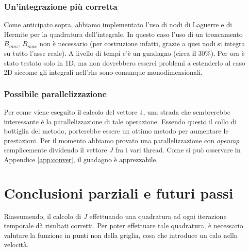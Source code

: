 \documentclass[a4paper,10pt]{article}
\begin{document}
\subsubsection{Un'integrazione più corretta}
Come anticipato sopra, abbiamo implementato l'uso di nodi di Laguerre e di Hermite per la quadratura dell'integrale. In questo caso l'uso di un troncamento $B_{min}$, $B_{max}$ non è necessario (per costruzione infatti, grazie a quei nodi si integra su tutto l'asse reale). A livello di tempi c'è un guadagno (circa il 30\%). Per ora \`e stato testato solo in 1D, ma non dovrebbero esserci problemi a estenderlo al caso 2D siccome gli integrali nell'rhs sono comunque monodimensionali.

\subsubsection{Possibile parallelizzazione}
Per come viene eseguito il calcolo del vettore J, una strada che sembrerebbe interessante è la parallelizzazione di tale operazione. Essendo questo il collo di bottiglia del metodo, porterebbe essere un ottimo metodo per aumentare le prestazioni. Per il momento abbiamo provato una parallelizzazione con \emph{openmp} semplicemente dividendo il vettore $J$ fra i vari thread. Come si può osservare in Appendice \ref{app:conver}, il guadagno \`e apprezzabile.

\section{Conclusioni parziali e futuri passi}

Riassumendo, il calcolo di $J$ effettuando una quadratura ad ogni iterazione temporale d\`a risultati corretti. Per poter effettuare tale quadratura, è necessario valutare la funzione in punti non della griglia, cosa che introduce un calo nella velocità.
\end{document}
